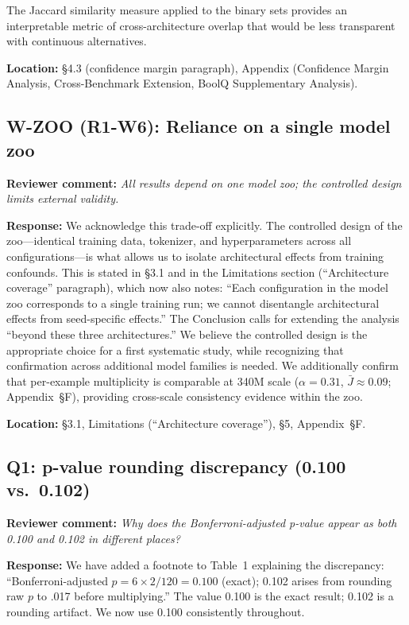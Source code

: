 \documentclass[11pt]{article}
\newcommand{\reviewer}[1]{\textcolor{reviewercolor}{\textbf{Reviewer comment:} \textit{#1}}}
\newcommand{\response}[1]{\textcolor{responsecolor}{\textbf{Response:} #1}}
\newcommand{\location}[1]{\textbf{Location:} #1}
\begin{document}
The Jaccard similarity measure applied to the binary sets provides an interpretable metric of cross-architecture overlap that would be less transparent with continuous alternatives.

\location{\S4.3 (confidence margin paragraph), Appendix (Confidence Margin Analysis, Cross-Benchmark Extension, BoolQ Supplementary Analysis).}

\subsection*{W-ZOO (R1-W6): Reliance on a single model zoo}

\reviewer{All results depend on one model zoo; the controlled design limits external validity.}

\response{We acknowledge this trade-off explicitly. The controlled design of the zoo---identical training data, tokenizer, and hyperparameters across all configurations---is what allows us to isolate architectural effects from training confounds. This is stated in \S3.1 and in the Limitations section (``Architecture coverage'' paragraph), which now also notes: ``Each configuration in the model zoo corresponds to a single training run; we cannot disentangle architectural effects from seed-specific effects.'' The Conclusion calls for extending the analysis ``beyond these three architectures.'' We believe the controlled design is the appropriate choice for a first systematic study, while recognizing that confirmation across additional model families is needed. We additionally confirm that per-example multiplicity is comparable at 340M scale ($\alpha = 0.31$, $\bar{J} \approx 0.09$; Appendix~\S F), providing cross-scale consistency evidence within the zoo.}

\location{\S3.1, Limitations (``Architecture coverage''), \S5, Appendix~\S F.}

\subsection*{Q1: p-value rounding discrepancy (0.100 vs.\ 0.102)}

\reviewer{Why does the Bonferroni-adjusted p-value appear as both 0.100 and 0.102 in different places?}

\response{We have added a footnote to Table~1 explaining the discrepancy: ``Bonferroni-adjusted $p = 6 \times 2/120 = 0.100$ (exact); 0.102 arises from rounding raw $p$ to .017 before multiplying.'' The value 0.100 is the exact result; 0.102 is a rounding artifact. We now use 0.100 consistently throughout.}
\end{document}
